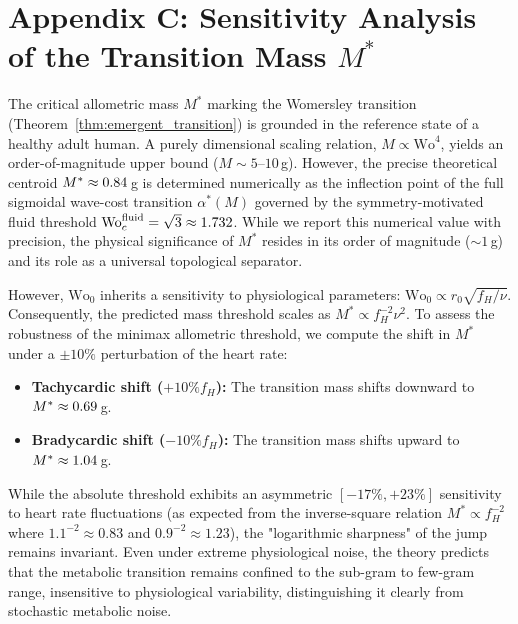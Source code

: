 
\section{Appendix C: Sensitivity Analysis of the Transition Mass $M^*$}
\label{app:sensitivity_mstar}

The critical allometric mass $M^*$ marking the Womersley transition
(Theorem~\ref{thm:emergent_transition}) is grounded in the reference state of a
healthy adult human. A purely dimensional scaling relation, $M \propto
\mathrm{Wo}^4$, yields an order-of-magnitude upper bound ($M \sim
5\text{--}10\,$g). However, the precise theoretical centroid $M^* \approx
0.84\,$g is determined numerically as the inflection point of the full
sigmoidal wave-cost transition $\alpha^*(M)$ governed by the symmetry-motivated
fluid threshold $\mathrm{Wo}_c^{\mathrm{fluid}} = \sqrt{3} \approx 1.732$.
While we report this numerical value with precision, the physical significance
of $M^*$ resides in its order of magnitude ($\sim\!1\,$g) and its role as a
universal topological separator.

However, $\mathrm{Wo}_0$ inherits a sensitivity to physiological parameters:
$\mathrm{Wo}_0 \propto r_0 \sqrt{f_H/\nu}$. Consequently, the predicted mass
threshold scales as $M^* \propto f_H^{-2} \nu^{2}$. To assess the robustness of
the minimax allometric threshold, we compute the shift in $M^*$ under a $\pm
10\%$ perturbation of the heart rate:
\begin{itemize}
    \item
\textbf{Tachycardic shift ($+10\% f_H$):} The transition mass shifts downward to
$M^* \approx 0.69\,$g.
    \item
\textbf{Bradycardic shift ($-10\% f_H$):} The transition mass shifts upward to
$M^* \approx 1.04\,$g.
\end{itemize}
While the absolute threshold exhibits an asymmetric $[-17\%, +23\%]$ sensitivity
to heart rate fluctuations (as expected from the inverse-square relation $M^*
\propto f_H^{-2}$ where $1.1^{-2} \approx 0.83$ and $0.9^{-2} \approx 1.23$),
the "logarithmic sharpness" of the jump remains invariant. Even under extreme
physiological noise, the theory predicts that the metabolic transition remains
confined to the sub-gram to few-gram range, insensitive to physiological
variability, distinguishing it clearly from stochastic metabolic noise.

